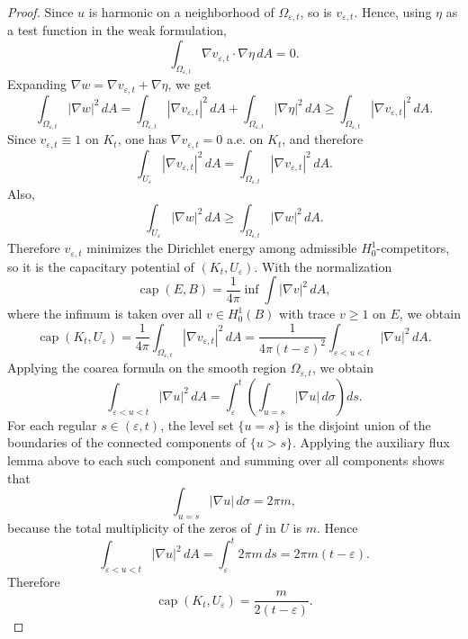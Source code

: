 \documentclass[12pt]{amsart}
\theoremstyle{definition}
\theoremstyle{remark}
\begin{document}
\begin{proof}
Since $u$ is harmonic on a neighborhood of $\Omega_{\varepsilon,t}$, so is $v_{\varepsilon,t}$. Hence, using $\eta$ as a test function in the weak formulation,
\[
\int_{\Omega_{\varepsilon,t}} \nabla v_{\varepsilon,t}\cdot \nabla \eta\, dA = 0.
\]
Expanding $\nabla w=\nabla v_{\varepsilon,t}+\nabla\eta$, we get
\[
\int_{\Omega_{\varepsilon,t}} |\nabla w|^2\,dA
=
\int_{\Omega_{\varepsilon,t}} |\nabla v_{\varepsilon,t}|^2\,dA
+
\int_{\Omega_{\varepsilon,t}} |\nabla \eta|^2\,dA
\ge
\int_{\Omega_{\varepsilon,t}} |\nabla v_{\varepsilon,t}|^2\,dA.
\]
Since $v_{\varepsilon,t}\equiv 1$ on $K_t$, one has $\nabla v_{\varepsilon,t}=0$ a.e. on $K_t$, and therefore
\[
\int_{U_\varepsilon} |\nabla v_{\varepsilon,t}|^2\,dA
=
\int_{\Omega_{\varepsilon,t}} |\nabla v_{\varepsilon,t}|^2\,dA.
\]
Also,
\[
\int_{U_\varepsilon} |\nabla w|^2\,dA
\ge
\int_{\Omega_{\varepsilon,t}} |\nabla w|^2\,dA.
\]
Therefore $v_{\varepsilon,t}$ minimizes the Dirichlet energy among admissible $H_0^1$-competitors, so it is the capacitary potential of $(K_t,U_\varepsilon)$. With the normalization
\[
\operatorname{cap}(E,B)
=
\frac1{4\pi}\inf \int |\nabla v|^2\,dA,
\]
where the infimum is taken over all $v\in H_0^1(B)$ with trace $v\ge 1$ on $E$, we obtain
\[
\operatorname{cap}(K_t,U_\varepsilon)
=
\frac1{4\pi}\int_{\Omega_{\varepsilon,t}} |\nabla v_{\varepsilon,t}|^2\,dA
=
\frac1{4\pi(t-\varepsilon)^2}\int_{\varepsilon<u<t} |\nabla u|^2\,dA.
\]
Applying the coarea formula on the smooth region $\Omega_{\varepsilon,t}$, we obtain
\[
\int_{\varepsilon<u<t} |\nabla u|^2\,dA
=
\int_\varepsilon^t
\left(\int_{u=s} |\nabla u|\,d\sigma\right) ds.
\]
For each regular $s\in(\varepsilon,t)$, the level set $\{u=s\}$ is the disjoint union
of the boundaries of the connected components of $\{u>s\}$. Applying the auxiliary
flux lemma above to each such component and summing over all components shows that
\[
\int_{u=s} |\nabla u|\,d\sigma = 2\pi m,
\]
because the total multiplicity of the zeros of $f$ in $U$ is $m$. Hence
\[
\int_{\varepsilon<u<t} |\nabla u|^2\,dA
=
\int_\varepsilon^t 2\pi m\,ds
=
2\pi m(t-\varepsilon).
\]
Therefore
\[
\operatorname{cap}(K_t,U_\varepsilon)=\frac{m}{2(t-\varepsilon)}.
\]


\end{proof}
\end{document}
